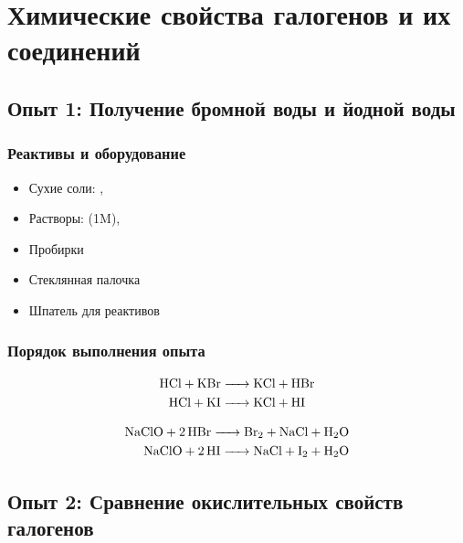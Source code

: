\documentclass[a4paper, 12pt]{article}
\begin{document}
\newpage


\section{Химические свойства галогенов и их соединений}


\subsection{Опыт 1: Получение бромной воды и йодной воды}

\subsubsection{Реактивы и оборудование}

\begin{itemize}
	\item Сухие соли: , 
	\item Растворы:  (1M), 
	
	\item Пробирки
	
	\item Стеклянная палочка
	
	\item Шпатель для реактивов
\end{itemize}

\subsubsection{Порядок выполнения опыта}

\begin{align}
	\ce{HCl + KBr &-> KCl + HBr}\\
	\ce{HCl + KI &-> KCl + HI}
\end{align}

\begin{align}
	\ce{NaClO + 2HBr -> Br2 + NaCl + H2O}\\
	\ce{NaClO + 2HI -> NaCl + I2 + H2O}
\end{align}


\subsection{Опыт 2: Сравнение окислительных свойств галогенов}
\end{document}
